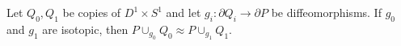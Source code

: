 Let $Q_0, Q_1$ be copies of $D^1 \times S^1$ and let $g_i: \partial Q_i \to \partial P$ be diffeomorphisms. If $g_0$ and $g_1$ are isotopic, then $P \cup_{g_0} Q_0 \approx P \cup_{g_1} Q_1$.

